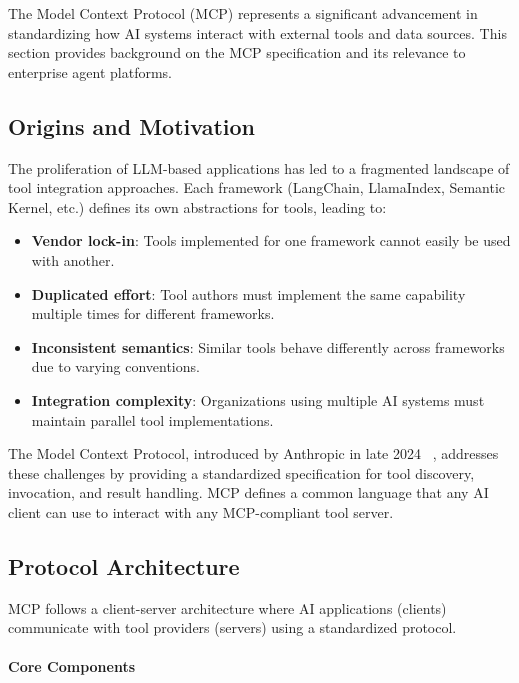 \documentclass[a4paper,twoside]{sapthesis}
\begin{document}
The Model Context Protocol (MCP) represents a significant advancement in standardizing how AI systems interact with external tools and data sources. This section provides background on the MCP specification and its relevance to enterprise agent platforms.

\subsection{Origins and Motivation}

The proliferation of LLM-based applications has led to a fragmented landscape of tool integration approaches. Each framework (LangChain, LlamaIndex, Semantic Kernel, etc.) defines its own abstractions for tools, leading to:

\begin{itemize}
    \item \textbf{Vendor lock-in}: Tools implemented for one framework cannot easily be used with another.
    \item \textbf{Duplicated effort}: Tool authors must implement the same capability multiple times for different frameworks.
    \item \textbf{Inconsistent semantics}: Similar tools behave differently across frameworks due to varying conventions.
    \item \textbf{Integration complexity}: Organizations using multiple AI systems must maintain parallel tool implementations.
\end{itemize}

The Model Context Protocol, introduced by Anthropic in late 2024~\cite{anthropic2024mcp}
, addresses these challenges by providing a standardized specification for tool discovery, invocation, and result handling. MCP defines a common language that any AI client can use to interact with any MCP-compliant tool server.

\subsection{Protocol Architecture}

MCP follows a client-server architecture where AI applications (clients) communicate with tool providers (servers) using a standardized protocol.

\paragraph{Core Components}
\end{document}
